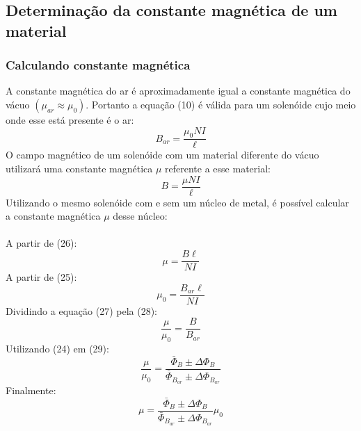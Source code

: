 \documentclass[column,brazilian,12pt,a4paper,final]{article}
\begin{document}
    \subsection{Determinação da constante magnética de um material}
      \subsubsection{Calculando constante magnética}
        A constante magnética do ar é aproximadamente igual a constante
        magnética do vácuo $(\mu_{ar} \approx \mu_0)$. Portanto a equação
        (10) é válida para um solenóide cujo meio onde esse está presente
        é o ar:
        \begin{equation}
          B_{ar} = \frac{\mu_0NI}{\ell}
        \end{equation}
        O campo magnético de um solenóide com um material diferente do vácuo 
        utilizará
        uma constante magnética $\mu$ referente a esse material:
        \begin{equation}
          B = \frac{\mu NI}{\ell}
        \end{equation}
        Utilizando o mesmo solenóide com e sem um núcleo de metal, é possível
        calcular a constante magnética $\mu$ desse núcleo:
        \\\\
        A partir de (26):
        \begin{equation}
          \mu = \frac{B \ell}{NI}
        \end{equation}
        A partir de (25):
        \begin{equation}
          \mu_0 = \frac{B_{ar} \ell}{NI}
        \end{equation}
        Dividindo a equação (27) pela (28):
        \begin{equation}
          \frac{\mu}{\mu_0} = \frac{B}{B_{ar}}
        \end{equation}
        Utilizando (24) em (29):
        \begin{equation}
          \frac{\mu}{\mu_0} = \frac{\bar{\Phi}_B \pm \Delta \Phi_B}
          {\bar{\Phi}_{B_{ar}} \pm \Delta \Phi_{B_{ar}}}
        \end{equation}
        Finalmente:
        \begin{equation}
          \mu = \frac{\bar{\Phi}_B \pm \Delta \Phi_B}
          {\bar{\Phi}_{B_{ar}} \pm \Delta \Phi_{B_{ar}}} \mu_0
        \end{equation}
\end{document}
